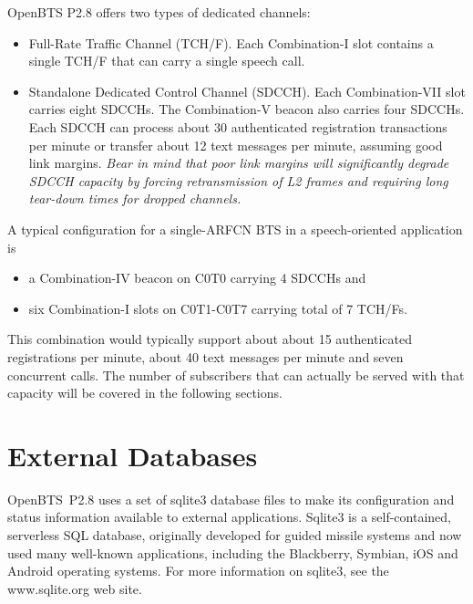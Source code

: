 \documentclass[11pt,openany]{book}
\begin{document}
OpenBTS P2.8 offers two types of dedicated channels:
\begin{itemize}
	\item Full-Rate Traffic Channel (TCH/F).  Each Combination-I slot contains a single TCH/F that can carry a single speech call.
	\item Standalone Dedicated Control Channel (SDCCH).  Each Combination-VII slot carries eight SDCCHs.  The Combination-V beacon also carries four SDCCHs.  Each SDCCH can process about 30 authenticated registration transactions per minute or transfer about 12 text messages per minute, assuming good link margins.  \emph{Bear in mind that poor link margins will significantly degrade SDCCH capacity by forcing retransmission of L2 frames and requiring long tear-down times for dropped channels.}
\end{itemize}

A typical configuration for a single-ARFCN BTS in a speech-oriented application is
\begin{itemize}
	\item a Combination-IV beacon on C0T0 carrying 4 SDCCHs and
	\item six Combination-I slots on C0T1-C0T7 carrying  total of 7 TCH/Fs.
\end{itemize}
This combination would typically support about about 15 authenticated registrations per minute, about 40 text messages per minute and seven concurrent calls.  The number of subscribers that can actually be served with that capacity will be covered in the following sections.










\chapter{External Databases}
\label{chap:databases}
OpenBTS~P2.8 uses a set of sqlite3 database files to make its configuration and status information available to external applications.
Sqlite3 is a self-contained, serverless SQL database, originally developed for guided missile systems and now used many well-known applications, including the Blackberry, Symbian, iOS and Android operating systems.  For more information on sqlite3, see the www.sqlite.org web site.
\end{document}
